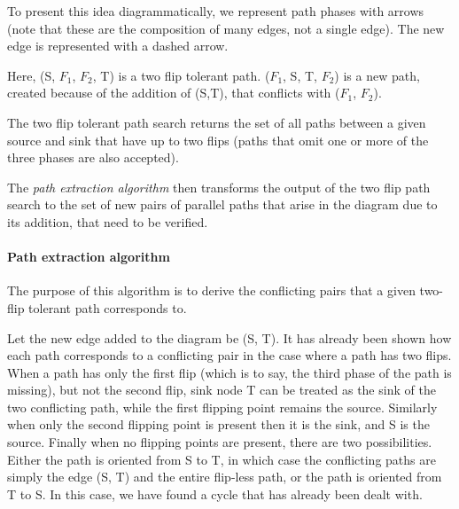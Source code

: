 \documentclass[runningheads]{llncs}
\begin{document}
To present this idea diagrammatically, we represent path phases with arrows (note that these are the composition of many edges, not a single edge). The new edge is represented with a dashed arrow.

\begin{center}
\end{center}
Here, (S, $F_1$, $F_2$, T) is a two flip tolerant path. ($F_1$, S, T, $F_2$) is a new path, created because of the addition of (S,T), that conflicts with ($F_1$, $F_2$).

The two flip tolerant path search returns the set of all paths between a given source and sink that have up to two flips (paths that omit one or more of the three phases are also accepted).

The \textit{path extraction algorithm} then transforms the output of the two flip path search to the set of new pairs of parallel paths that arise in the diagram due to its addition, that need to be verified.

\paragraph{Path extraction algorithm}
The purpose of this algorithm is to derive the conflicting pairs that a given two-flip tolerant path corresponds to.

Let the new edge added to the diagram be (S, T).
It has already been shown how each path corresponds to a conflicting pair in the case where a path has two flips. When a path has only the first flip (which is to say, the third phase of the path is missing), but not the second flip, sink node T can be treated as the sink of the two conflicting path, while the first flipping point remains the source. Similarly when only the second flipping point is present then it is the sink, and S is the source. Finally when no flipping points are present, there are two possibilities. 
Either the path is oriented from S to T, in which case the conflicting paths are simply the edge (S, T) and the entire flip-less path, or the path is oriented from T to S. In this case, we have found a cycle that has already been dealt with.
\end{document}
